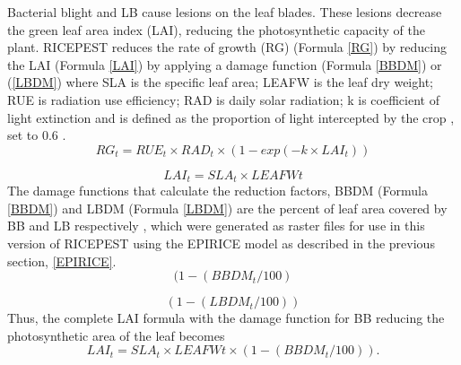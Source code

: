 \documentclass[preprint,review,12pt]{elsarticle}
\begin{document}
    Bacterial blight and LB cause lesions on the leaf blades. These lesions decrease the green leaf area index (LAI), reducing the photosynthetic capacity of the plant. RICEPEST reduces the rate of growth (RG) (Formula \ref{RG}) by reducing the LAI (Formula \ref{LAI}) by applying a damage function (Formula \ref{BBDM}) or (\ref{LBDM}) where SLA is the specific leaf area; LEAFW is the leaf dry weight; RUE is radiation use efficiency; RAD is daily solar radiation; k is coefficient of light extinction and is defined as the proportion of light intercepted by the crop \cite{Willocquet2000}, set to 0.6 \cite{Willocquet2002}.
    \begin{equation}
    RG_t = RUE_t \times RAD_t \times (1- exp(- k \times LAI_t))
    \label{RG}
    \end{equation}
    
    \begin{equation}
    LAI_t = SLA_t \times LEAFWt
    \label{LAI}
    \end{equation}
    The damage functions that calculate the reduction factors, BBDM (Formula \ref{BBDM}) and LBDM (Formula \ref{LBDM}) are the percent of leaf area covered by BB and LB respectively \cite{Willocquet2002}, which were generated as raster files for use in this version of RICEPEST using the EPIRICE model as described in the previous section, \ref{EPIRICE}. 
    \begin{equation}
    (1-(BBDM_t /100)
    \label{BBDM}
    \end{equation}
    
    \begin{equation}
    (1-(LBDM_t /100))
    \label{LBDM}
    \end{equation}
    Thus, the complete LAI formula with the damage function for BB reducing the photosynthetic area of the leaf becomes
     \begin{equation}
    LAI_t = SLA_t \times LEAFWt \times (1-(BBDM_t / 100)).
    \label{LAIBBDM}
    \end{equation}
    
\end{document}
